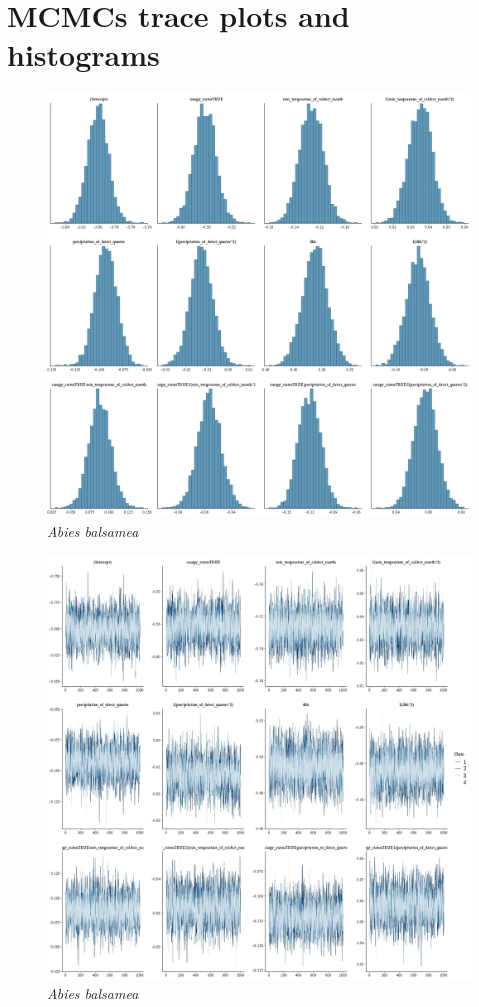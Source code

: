 \documentclass[letterpaper, 12pt]{article}
\begin{document}
\section{MCMCs trace plots and histograms}
\begin{figure}[h]
	\centering
	\includegraphics[scale=0.4]{./18032-ABI-BAL_hist}
	\caption{\textit{Abies balsamea}}
\end{figure}

\begin{figure}
	\centering
	\includegraphics[scale=0.4]{./18032-ABI-BAL_traces}
	\caption{\textit{Abies balsamea}}
\end{figure}
\end{document}

